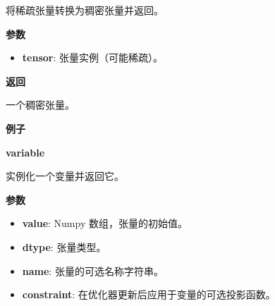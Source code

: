 \begin{Shaded}
\begin{Highlighting}[]
\end{Highlighting}
\end{Shaded}

将稀疏张量转换为稠密张量并返回。

\textbf{参数}

\begin{itemize}
\tightlist
\item
  \textbf{tensor}: 张量实例（可能稀疏）。
\end{itemize}

\textbf{返回}

一个稠密张量。

\textbf{例子}

\begin{Shaded}
\begin{Highlighting}[]
\OperatorTok{>>>}    
\OperatorTok{>>>} \OperatorTok{=} \NormalTok{, }\OperatorTok{=}\NormalTok{)}
\OperatorTok{>>>} 
\OperatorTok{>>>} \OperatorTok{=} 
\OperatorTok{>>>} 
\end{Highlighting}
\end{Shaded}


\textbf{variable}\label{variable}

\begin{Shaded}
\begin{Highlighting}[]
\OperatorTok{=}\OperatorTok{=}\OperatorTok{=}\NormalTok{)}
\end{Highlighting}
\end{Shaded}

实例化一个变量并返回它。

\textbf{参数}

\begin{itemize}
\tightlist
\item
  \textbf{value}: Numpy 数组，张量的初始值。
\item
  \textbf{dtype}: 张量类型。
\item
  \textbf{name}: 张量的可选名称字符串。
\item
  \textbf{constraint}: 在优化器更新后应用于变量的可选投影函数。
\end{itemize}

